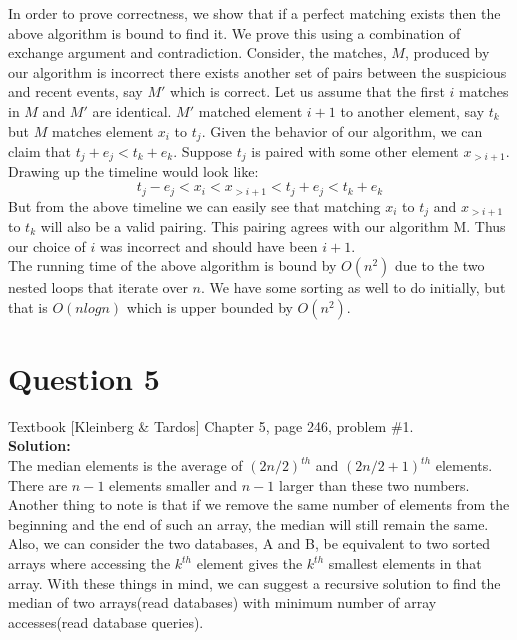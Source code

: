 \documentclass[11pt]{article}
\begin{document}
In order to prove correctness, we show that if a perfect matching exists then the above algorithm is bound to find it. We prove this using a combination of exchange argument and contradiction. Consider, the matches, $ M $, produced by our algorithm is incorrect there exists another set of pairs between the suspicious and recent events, say $ M' $ which is correct. Let us assume that the first $ i $ matches in $ M $ and $ M' $ are identical. $ M' $ matched element $ i+1 $ to another element, say $ t_k $ but $ M $ matches element $ x_i $ to $ t_j $. Given the behavior of our algorithm, we can claim that $ t_j+e_j < t_k+e_k $. Suppose $t_j$ is paired with some other element $ x_{>i+1} $. Drawing up the timeline would look like:
\begin{equation*}
t_j-e_j < x_i < x_{>i+1} < t_j+e_j < t_k+e_k
\end{equation*}
But from the above timeline we can easily see that matching $ x_i $ to $ t_j $ and $ x_{>i+1} $ to $ t_k $ will also be a valid pairing. This pairing agrees with our algorithm M. Thus our choice of $ i $ was incorrect and should have been $ i+1 $. \\

The running time of the above algorithm is bound by $ O(n^2) $ due to the two nested loops that iterate over $ n $. We have some sorting as well to do initially, but that is $ O(nlogn) $ which is upper bounded by $ O(n^2) $.

\clearpage
\section{Question 5} Textbook [Kleinberg \& Tardos] Chapter 5, page 246, problem \#1. \\
\textbf{Solution:} \\

The median elements is the average of $ (2n/2)^{th} $ and $ (2n/2 + 1)^{th} $ elements. There are $ n-1 $ elements smaller and $ n-1 $ larger than these two numbers. Another thing to note is that if we remove the same number of elements from the beginning and the end of such an array, the median will still remain the same. Also, we can consider the two databases, A and B, be equivalent to two sorted arrays where accessing the $ k^{th} $ element gives the $ k^{th} $ smallest elements in that array. With these things in mind, we can suggest a recursive solution to find the median of two arrays(read databases) with minimum number of array accesses(read database queries). \\
\end{document}
